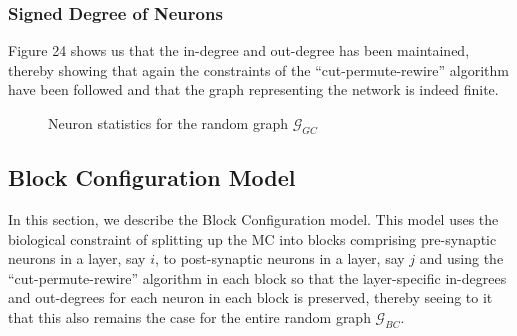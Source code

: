 \subsubsection{Signed Degree of Neurons}
Figure 24 shows us that the in-degree and out-degree has been maintained, thereby showing that again the constraints of the  ``cut-permute-rewire'' \cite{WattsStrogatz1998} algorithm have been followed and that the graph representing the network is indeed finite.
\begin{figure}[H]%
    \centering
    \captionsetup{justification=centering}
    \qquad
    \caption{Neuron statistics for the random graph $\mathcal{G}_{GC}$}%
    \label{fig:example}%
\end{figure}



\newpage
\subsection{Block Configuration Model}
In this section, we describe the Block Configuration model. This model uses the biological constraint of splitting up the MC into blocks comprising pre-synaptic neurons in a layer, say $i$, to post-synaptic neurons in a layer, say $j$ and using the ``cut-permute-rewire'' \cite{WattsStrogatz1998} algorithm in each block so that the layer-specific in-degrees and out-degrees for each neuron in each block is preserved, thereby seeing to it that this also remains the case for the entire random graph $\mathcal{G}_{BC}$.

